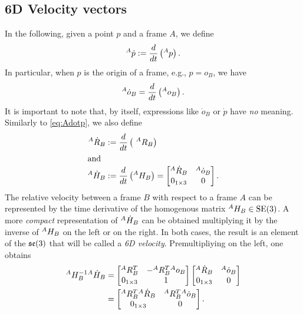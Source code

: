 \subsection{6D Velocity vectors} 
In the following, given a point $p$ and
a frame $A$, we define
\begin{align}
\label{eq:Adotp}
  \hspace{0em}^A \dot p :=  \frac{d}{dt} \left( \hspace{0em}^A p \right) .
\end{align}
In particular, when $p$ is the origin of a frame, e.g., $p = o_B$, we have
$$
 \hspace{0em}^A \dot{o}_B =
 \frac{d}{dt} \left(\hspace{0em}^A o_B \right) .
$$
It is important to note that, by itself, expressions like $\dot o_B$ or $\dot p$ have {\em no} meaning.
Similarly to \eqref{eq:Adotp}, we also define
\begin{align}
\hspace{0em}^{A} \dot{R}_{B} & := \frac{d}{dt} \left( ~^{A} R_{B} \right) \\
\intertext{and} 
  \hspace{0em}^A \dot H_B 
  & := \frac{d}{dt} \left( \hspace{0em}^A H_B \right)
   = 
  \begin{bmatrix}
    \hspace{0em}^A {\dot R}_B & \hspace{0em}^A {\dot o}_B \\
     0_{1\times3} & 0
  \end{bmatrix} .
\end{align}
The relative velocity between a frame $B$ with respect to a frame $A$ can be represented by the time derivative of the homogenous matrix 
$\hspace{0em}^A H_B \in \textrm{SE}(3)$. A more \emph{compact} representation of 
$\hspace{0em}^A {\dot H}_B$ can be obtained
multiplying it by the inverse of $\hspace{0em}^A H_B$ on the left or on the right.
In both cases, the result is an element of the $\mathfrak{se}(3)$ that will be called 
a {\em 6D velocity}. Premultipliying on the left, one obtains
\begin{align} \label{eq:se3ex}
  \hspace{0em}^{A} H_{B}^{-1} \hspace{0em}^{A} \dot{H}_{B}  
  & =  
  \begin{bmatrix} 
    \hspace{0em}^A {R}_B^T & -\hspace{0em}^A {R}_B^T \hspace{0em}^Ao_B \\
    0_{1\times3} & 1
  \end{bmatrix}
  \begin{bmatrix}
    \hspace{0em}^A \dot{R}_B & \hspace{0em}^A{\dot o}_B \\
    0_{1\times3} & 0
  \end{bmatrix} 
  \notag\\
  & =
  \begin{bmatrix}
    \hspace{0em}^AR_B^T \hspace{0em}^A {\dot R}_B & \hspace{0em}^AR_B^T \hspace{0em}^A {\dot o}_B \\
    0_{1\times3} & 0
  \end{bmatrix} .
\end{align}
